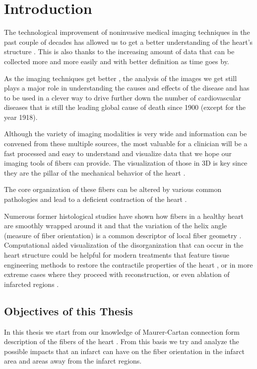 \chapter{Introduction}

The technological improvement of noninvasive medical imaging techniques in the past couple of decades has allowed us to get a better understanding of the heart's structure \cite{sinusas2008multimodality}. This is also thanks to the increasing amount of data that can be collected more and more easily and with better definition as time goes by.

As the imaging techniques get better \cite{shaw2010cardiovascular}, the analysis of the images we get still plays a major role in understanding the causes and effects of the disease and has to be used in a clever way to drive further down the number of cardiovascular diseases that is still the leading global cause of death \cite{mozaffarian2015heart} since 1900 (except for the year 1918).

Although the variety of imaging modalities is very wide and information can be convened from these multiple sources, the most valuable for a clinician will be a fast processed and easy to understand and visualize data that we hope our imaging tools of fibers can provide. The visualization of those in 3D is key since they are the pillar of the mechanical behavior of the heart \cite{hooks2002cardiac}.

The core organization of these fibers can be altered by various common pathologies and lead to a deficient contraction of the heart \cite{beg2004computational}.

Numerous former histological studies have shown how fibers in a healthy heart are smoothly wrapped around it and that the variation of the helix angle (measure of fiber orientation) is a common descriptor of local fiber geometry \cite{geerts2002characterization}. Computational aided visualization of the disorganization that can occur in the heart structure could be helpful for modern treatments that feature tissue engineering methods to restore the contractile properties of the heart \cite{caplan2006mesenchymal,laflamme2007cardiomyocytes,laflamme2005regenerating, song2012heart, zimmermann2004engineered}, or in more extreme cases where they proceed with reconstruction, or even ablation of infarcted regions \cite{athanasuleas2004surgical, di2001effects, jones2009coronary, sartipy2005dor}.

\section{Objectives of this Thesis}

In this thesis we start from our knowledge of Maurer-Cartan connection form description of the fibers of the heart \cite{pami2015}. From this basis we try and analyze the possible impacts that an infarct can have on the fiber orientation in the infarct area and areas away from the infarct regions.